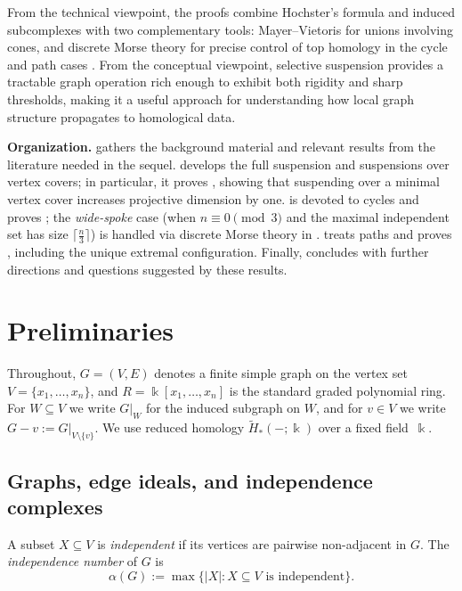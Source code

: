 \documentclass[12pt]{amsart}
\theoremstyle{plain}
\theoremstyle{definition}
\begin{document}
From the technical viewpoint, the proofs combine Hochster's formula and induced subcomplexes with two
complementary tools: Mayer--Vietoris for unions involving cones, and discrete Morse theory for
precise control of top homology in the cycle and path cases \cite{Forman98,KozlovBook,JonssonGraphs}.
From the conceptual viewpoint, selective suspension provides a tractable graph operation rich enough to
exhibit both rigidity and sharp thresholds, making it a useful approach for understanding how
local graph structure propagates to homological data.



\textbf{Organization.}
 gathers the background material and relevant results from the literature needed in the sequel.
 develops the full suspension and suspensions over vertex covers; in particular, it proves , showing that suspending over a minimal vertex cover increases projective dimension by one.
 is devoted to cycles and proves ; the \emph{wide-spoke} case (when $n\equiv 0 \pmod 3$ and the maximal independent set has size $\lceil \frac{n}{3} \rceil$) is handled via discrete Morse theory in .
 treats paths and proves , including the unique extremal configuration.
Finally,  concludes with further directions and questions suggested by these results.


\section{Preliminaries}\label{sec:preliminaries}

Throughout, $G=(V,E)$ denotes a finite simple graph on the vertex set
$V=\{x_1,\dots,x_n\}$, and $R=\Bbbk[x_1,\dots,x_n]$ is the standard graded polynomial ring.
For $W\subseteq V$ we write $G|_W$ for the induced subgraph on $W$, and for $v\in V$ we write
$G-v:=G|_{V\setminus\{v\}}$. We use reduced homology $\widetilde H_\ast(-;\Bbbk)$ over a fixed
field~$\Bbbk$.

\subsection{Graphs, edge ideals, and independence complexes}

\begin{defn}\label{def:independent-sets}
A subset $X\subseteq V$ is \emph{independent} if its vertices are pairwise non-adjacent in $G$.
The \emph{independence number} of $G$ is
\[
\alpha(G):=\max\{|X| : X\subseteq V \text{ is independent}\}.
\]
\end{defn}
\end{document}
